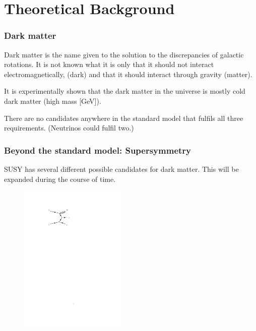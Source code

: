 \documentclass[•]{beamer}
\theoremstyle{remark}
\begin{document}
\section{Theoretical Background}
\begin{frame}[shrink=10]\frametitle{Dark matter}
\begin{block}

Dark matter is the name given to the solution to the discrepancies of galactic rotations. It is not known what it is only that it should not interact electromagnetically, (dark) and that it should interact through gravity (matter). 

It is experimentally shown that the  dark matter in the universe is mostly cold dark matter (high mass [GeV]). 

There are no candidates anywhere in the standard model that fulfils all three requirements. (Neutrinos could fulfil two.)
\end{block}
\end{frame}
\begin{frame}[shrink=10]\frametitle{Beyond the standard model: Supersymmetry}
\begin{block}

SUSY has several different possible candidates for dark matter. 
This will be expanded during the course of time.
\end{block}
\begin{figure}
\includegraphics[trim=5cm 22cm 11cm 3.9cm,clip=true, width=0.45\textwidth]{dm.pdf}
\end{figure}
\end{frame}
\end{document}
